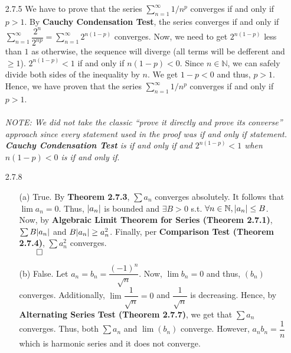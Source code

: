 \documentclass[11pt]{article}
\DeclarePairedDelimiter\abs{\lvert}{\rvert}%
\newcommand{\nats}{\mathbb{N}}
\begin{document}
\begin{itemize}
    \item[2.7.5]
        We have to prove that the series $\sum_{n = 1}^\infty 1/n^p$ converges
        if and only if $p > 1$. By \textbf{Cauchy Condensation Test}, the
        series converges if and only if $\sum_{n = 1}^\infty
        \dfrac{2^n}{2^{np}} = \sum_{n = 1}^\infty 2^{n(1 - p)}$ converges. Now,
        we need to get $2^{n(1 - p)}$ less than $1$ as otherwise, the sequence
        will diverge (all terms will be defferent and $\geq 1$). $2^{n(1 - p)}
        < 1$ if and only if $n(1 - p) < 0$. Since $n \in \nats$, we can safely
        divide both sides of the inequality by $n$. We get $1 - p < 0$ and
        thus, $p > 1$.  Hence, we have proven that the series $\sum_{n =
        1}^\infty 1/n^p$ converges if and only if $p > 1$.
        \\\\
        \textit{NOTE: We did not take the classic ``prove it directly and prove
        its converse'' approach since every statement used in the proof was if
        and only if statement. \textbf{Cauchy Condensation Test} is if and only
        if and $2^{n(1 - p)} < 1$ when $n(1 - p) < 0$ is if and only if}.

    \item[2.7.8]
        \begin{itemize}
            \item[(a)]
                True. By \textbf{Theorem 2.7.3}, $\sum{a_n}$ converges
                absolutely. It follows that $\lim{a_n} = 0$. Thus, $\abs{a_n}$
                is bounded and $\exists B > 0$ s.t. $\forall n \in \nats,
                \abs{a_n} \leq B$. Now, by \textbf{Algebraic Limit Theorem for
                Series (Theorem 2.7.1)}, $\sum{B\abs{a_n}}$ and $B\abs{a_n}
                \geq a^2_n$. Finally, per \textbf{Comparison Test (Theorem
                2.7.4)}, $\sum{a^2_n}$ converges.\\
                $\qed$

            \item[(b)]
                False. Let $a_n = b_n = \dfrac{(-1)^n}{\sqrt{n}}$. Now,
                $\lim{b_n} = 0$ and thus, $(b_n)$ converges. Additionally,
                $\lim{\dfrac{1}{\sqrt{n}}} = 0$ and $\dfrac{1}{\sqrt{n}}$ is
                decreasing. Hence, by \textbf{Alternating Series Test (Theorem
                2.7.7)}, we get that $\sum{a_n}$ converges. Thus, both
                $\sum{a_n}$ and $\lim{(b_n)}$ converge. However, $a_nb_n =
                \dfrac{1}{n}$ which is harmonic series and it does not
                converge.


\end{itemize}
\end{itemize}
\end{document}
